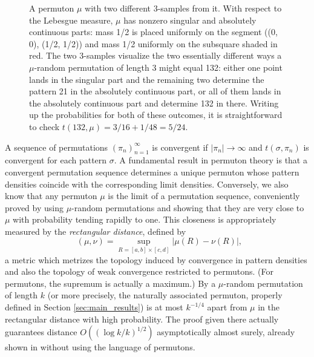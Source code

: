 \documentclass{article}
\newcommand{\ds}{\mathop{d_\square}}
\theoremstyle{definition}
\begin{document}
\begin{figure}
\caption{A permuton $\mu$ with two different 3-samples from it. With respect to the Lebesgue measure, $\mu$ has nonzero singular and absolutely continuous parts: mass 1/2 is placed uniformly on the segment ((0, 0), (1/2, 1/2)) and mass 1/2 uniformly on the subsquare shaded in red. The two 3-samples visualize the two essentially different ways a $\mu$-random permutation of length 3 might equal 132: either one point lands in the singular part and the remaining two determine the pattern 21 in the absolutely continuous part, or all of them lands in the absolutely continuous part and determine 132 in there. Writing up the probabilities for both of these outcomes, it is straightforward to check $t(132, \mu)=3/16+1/48=5/24$.} \label{fig:mu_random_permutations}
\end{figure}

A sequence of permutations $(\pi_n)_{n=1}^{\infty}$ is convergent if $|\pi_n|\to\infty$ and $t(\sigma, \pi_n)$ is convergent for each pattern $\sigma$. A fundamental result in permuton theory \cite{HOPPEN201393} is that a convergent permutation sequence determines a unique permuton whose pattern densities coincide with the corresponding limit densities. Conversely, we also know that any permuton $\mu$ is the limit of a permutation sequence, conveniently proved by using $\mu$-random permutations and showing that they are very close to $\mu$ with probability tending rapidly to one. This closeness is appropriately measured by the \emph{rectangular distance},
defined by
$$\ds(\mu, \nu)=\sup_{R=[a,b]\times [c, d]}|\mu(R)-\nu(R)|,$$
a metric which metrizes the topology induced by convergence in pattern densities and also the topology of weak convergence restricted to permutons. (For permutons, the supremum is actually a maximum.) By \cite[Lemma~4.2]{HOPPEN201393} a $\mu$-random permutation of length $k$ (or more precisely, the naturally associated permuton, properly defined in Section \ref{sec:main_results}) is at most $k^{-1/4}$ apart from $\mu$ in the rectangular distance with high probability. The proof given there actually guarantees distance $O((\log k/k)^{1/2})$ asymptotically almost surely, already shown in \cite[Lemma~4.9]{cooper2002quasirandompermutations} without using the language of permutons.
\end{document}

